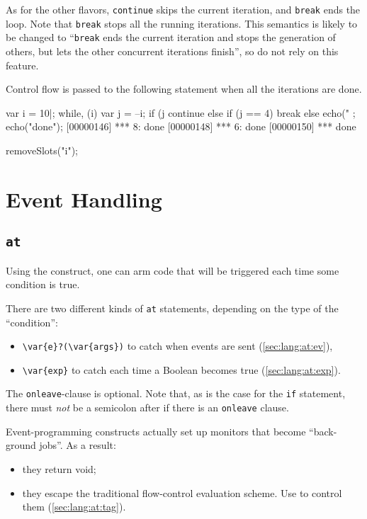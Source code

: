 As for the other flavors, \lstinline{continue} skips the current iteration,
and \lstinline{break} ends the loop.  Note that \lstinline{break} stops all
the running iterations.  This semantics is likely to be changed to
``\lstinline{break} ends the current iteration and stops the generation of
others, but lets the other concurrent iterations finish'', so do not rely on
this feature.

Control flow is passed to the following statement when all the iterations
are done.

\begin{urbiscript}
var i = 10|;
while, (i)
{
  var j = --i;
  if (j %
    continue
  else if (j == 4)
    break
  else
    echo("%
};
echo("done");
[00000146] *** 8: done
[00000148] *** 6: done
[00000150] *** done
\end{urbiscript}
\begin{urbicomment}
removeSlots("i");
\end{urbicomment}


\section{Event Handling}
\label{sec:lang:event}
\subsection{\lstinline{at}}
\label{sec:lang:at}
Using the  construct, one can arm code that will be
triggered each time some condition is true.


There are two different kinds of \lstinline{at} statements, depending on the
type of the ``condition'':
\begin{itemize}
\item \lstinline|\var{e}?(\var{args})| to catch when events are sent
  (\autoref{sec:lang:at:ev}),
\item \lstinline|\var{exp}| to catch each time a Boolean  becomes
  true (\autoref{sec:lang:at:exp}).
\end{itemize}

The \lstinline{onleave}-clause is optional.  Note that, as is the case for
the \lstinline{if} statement, there must \emph{not} be a semicolon after
 if there is an \lstinline{onleave} clause.

Event-programming constructs actually set up monitors that become
``back-ground jobs''.  As a result:
\begin{itemize}
\item they return void;
\item they escape the traditional flow-control evaluation scheme.  Use
   to control them (\autoref{sec:lang:at:tag}).
\end{itemize}

